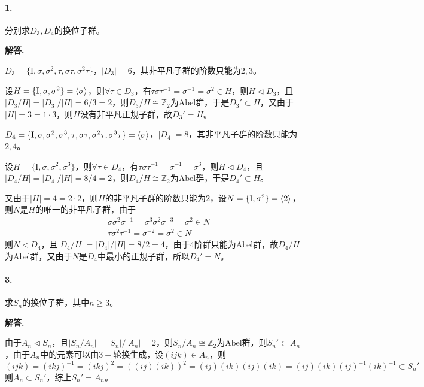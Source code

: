 \documentclass[12pt, a4paper, oneside]{ctexart}
\newenvironment{solution}{\par\noindent\textbf{解答. }}{\bigskip\par}
\begin{document}
\paragraph{1.}分别求$D_3,D_4$的换位子群。
\begin{solution}

    $D_3 = \{\text{I}, \sigma, \sigma^2, \tau, \sigma\tau, \sigma^2\tau\}$，$|D_3| = 6$，其非平凡子群的阶数只能为$2,3$。
    
    设$H=\{\text{I}, \sigma, \sigma^2\}=\braket{\sigma}$，则$\forall \tau\in D_3$，有$\tau\sigma\tau^{-1} = \sigma^{-1} = \sigma^{2}\in H$，则$H\triangleleft D_3$，且$|D_3/H|=|D_3|/|H|=6/3=2$，则$D_3/H\cong \mathbb Z_2$为$\text{Abel群}$，于是$D_3'\subset H$，又由于$|H| = 3=1\cdot 3$，则$H$没有非平凡正规子群，故$D_3' = H$。

    $D_4 = \{\text{I},\sigma,\sigma^2,\sigma^3,\tau,\sigma\tau,\sigma^2\tau,\sigma^3\tau\}=\braket{\sigma}$，$|D_4|=8$，其非平凡子群的阶数只能为$2,4$。

    设$H=\{\text{I}, \sigma,\sigma^2,\sigma^3\}$，则$\forall \tau\in D_4$，有$\tau\sigma\tau^{-1}=\sigma^{-1}=\sigma^3$，则$H\triangleleft D_4$，且$|D_4/H|=|D_4|/|H|=8/4=2$，则$D_4/H\cong\mathbb Z_2$为$\text{Abel群}$，于是$D_4'\subset H$。

    又由于$|H|=4=2\cdot 2$，则$H$的非平凡子群的阶数只能为$2$，设$N=\{\text{I}, \sigma^2\}=\braket{2}$，则$N$是$H$的唯一的非平凡子群，由于
    \begin{equation*}
        \begin{aligned}
            &\sigma\sigma^2\sigma^{-1}=\sigma^3\sigma^2\sigma^{-3}=\sigma^{2}\in N\\
            &\tau\sigma^2\tau^{-1}=\sigma^{-2}=\sigma^2\in N
        \end{aligned}
    \end{equation*}
    则$N\triangleleft D_4$，且$|D_4/H|=|D_4|/|H|=8/2=4$，由于$4$阶群只能为$\text{Abel群}$，故$D_4/H$为$\text{Abel群}$，又由于$N$是$D_4$中最小的正规子群，所以$D_4'=N$。
\end{solution}

\paragraph{3.}求$S_n$的换位子群，其中$n\geqslant 3$。
\begin{solution}
    
    由于$A_n\triangleleft S_n$，且$|S_n/A_n| = |S_n|/|A_n|=2$，则$S_n/A_n\cong \mathbb Z_2$为$\text{Abel群}$，则$S_n'\subset A_n$，由于$A_n$中的元素可以由$3-\text{轮换}$生成，设$(i j k)\in A_n$，则
    \begin{equation*}
        (ijk)=(ikj)^{-1}=(ikj)^2=((ij)(ik))^2=(ij)(ik)(ij)(ik)=(ij)(ik)(ij)^{-1}(ik)^{-1}\subset S_n'
    \end{equation*}
    则$A_n\subset S_n'$，综上$S_n'=A_n$。
\end{solution}
\end{document}
